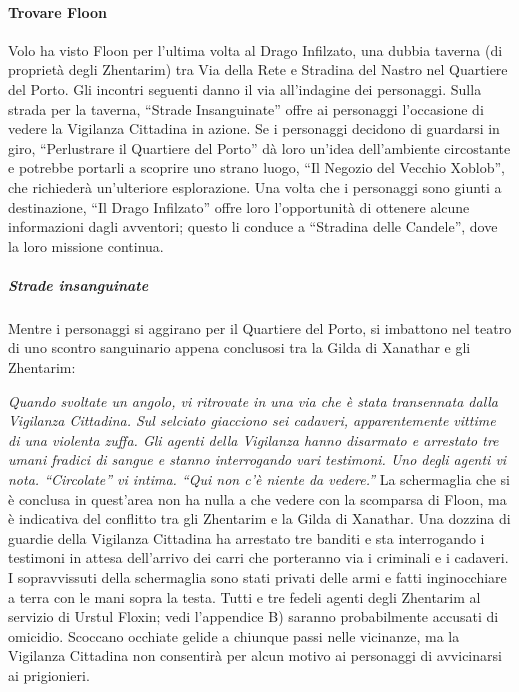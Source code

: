 \documentclass{article}
\begin{document}
\paragraph{Trovare Floon}Volo ha visto Floon per l'ultima volta al Drago Infilzato, una dubbia taverna (di proprietà degli Zhentarim) tra Via della Rete e Stradina del Nastro nel Quartiere del Porto. Gli incontri seguenti danno il via all'indagine dei personaggi. 
Sulla strada per la taverna, “Strade Insanguinate” offre ai personaggi l'occasione di vedere la Vigilanza Cittadina in azione. Se i personaggi decidono di guardarsi in giro, “Perlustrare il Quartiere del Porto” dà loro un'idea dell'ambiente circostante e potrebbe portarli a scoprire uno strano luogo, “Il Negozio del Vecchio Xoblob”, che richiederà un'ulteriore esplorazione. Una volta che i personaggi sono giunti a destinazione, “Il Drago Infilzato” offre loro l'opportunità di ottenere alcune informazioni dagli avventori; questo li conduce a “Stradina delle Candele”, dove la loro missione continua.
\subparagraph{Strade insanguinate}
 Mentre i personaggi si aggirano per il Quartiere del Porto, si imbattono nel teatro di uno scontro sanguinario appena conclusosi tra la Gilda di Xanathar e gli Zhentarim: \newline

\textit{Quando svoltate un angolo, vi ritrovate in una via che è stata transennata dalla Vigilanza Cittadina. Sul selciato giacciono sei cadaveri, apparentemente vittime di una violenta zuffa. Gli agenti della Vigilanza hanno disarmato e arrestato tre umani fradici di sangue e stanno interrogando vari testimoni. Uno degli agenti vi nota. 
“Circolate” vi intima. “Qui non c'è niente da vedere.”}
\newline
    La schermaglia che si è conclusa in quest'area non ha nulla a che vedere con la scomparsa di Floon, ma è indicativa del conflitto tra gli Zhentarim e la Gilda di Xanathar. 
Una dozzina di guardie della Vigilanza Cittadina ha arrestato tre banditi e sta interrogando i testimoni in attesa dell’arrivo dei carri che porteranno via i criminali e i cadaveri. I sopravvissuti della schermaglia sono stati privati delle armi e fatti inginocchiare a terra con le mani sopra la testa. Tutti e tre fedeli agenti degli Zhentarim al servizio di Urstul Floxin; vedi l’appendice B) saranno probabilmente accusati di omicidio. Scoccano occhiate gelide a chiunque passi nelle vicinanze, ma la Vigilanza Cittadina non consentirà per alcun motivo ai personaggi di avvicinarsi ai prigionieri.
\end{document}
